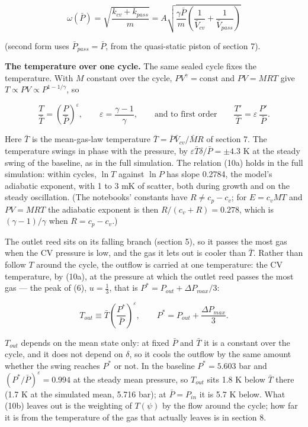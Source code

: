 \documentclass[11pt]{article}
\begin{document}
\begin{equation}
\omega(\bar P) = \sqrt{\frac{k_{cv}+k_{pass}}{m}} = A\sqrt{\frac{\gamma\bar P}{m}\left(\frac{1}{\bar V_{cv}} + \frac{1}{\bar V_{pass}}\right)} \tag{12}
\end{equation}

(second form uses $\bar P_{pass} = \bar P$, from the quasi-static piston of section 7).

\textbf{The temperature over one cycle.} The same sealed cycle fixes the temperature. With $M$ constant over the cycle, $PV^{\gamma} = \mathrm{const}$ and $PV = MRT$ give $T \propto PV \propto P^{1-1/\gamma}$, so

\begin{equation}
\frac{T}{\bar T} = \left(\frac{P}{\bar P}\right)^{\varepsilon}, \qquad \varepsilon = \frac{\gamma-1}{\gamma}, \qquad\text{and to first order}\qquad \frac{T'}{\bar T} = \varepsilon\,\frac{P'}{\bar P} . \tag{10a}
\end{equation}

Here $\bar T$ is the mean-gas-law temperature $\bar T = \bar P\bar V_{cv}/\bar MR$ of section 7. The temperature swings in phase with the pressure, by $\varepsilon\bar T\delta/\bar P = \pm 4.3$ K at the steady swing of the baseline, as in the full simulation. The relation (10a) holds in the full simulation: within cycles, $\ln T$ against $\ln P$ has slope 0.2784, the model's adiabatic exponent, with 1 to 3 mK of scatter, both during growth and on the steady oscillation. (The notebooks' constants have $R \ne c_p - c_v$; for $E = c_vMT$ and $PV = MRT$ the adiabatic exponent is then $R/(c_v + R) = 0.278$, which is $(\gamma - 1)/\gamma$ when $R = c_p - c_v$.)

The outlet reed sits on its falling branch (section 5), so it passes the most gas when the CV pressure is low, and the gas it lets out is cooler than $\bar T$. Rather than follow $T$ around the cycle, the outflow is carried at one temperature: the CV temperature, by (10a), at the pressure at which the outlet reed passes the most gas --- the peak of (6), $u = \tfrac13$, that is $P^* = P_{out} + \Delta P_{max}/3$:

\begin{equation}
T_{out} \equiv \bar T\left(\frac{P^*}{\bar P}\right)^{\varepsilon}, \qquad P^* = P_{out} + \frac{\Delta P_{max}}{3} . \tag{10b}
\end{equation}

$T_{out}$ depends on the mean state only: at fixed $\bar P$ and $\bar T$ it is a constant over the cycle, and it does not depend on $\delta$, so it cools the outflow by the same amount whether the swing reaches $P^*$ or not. In the baseline $P^* = 5.603$ bar and $(P^*/\bar P)^{\varepsilon} = 0.994$ at the steady mean pressure, so $T_{out}$ sits 1.8 K below $\bar T$ there (1.7 K at the simulated mean, 5.716 bar); at $\bar P = P_{in}$ it is 5.7 K below. What (10b) leaves out is the weighting of $T(\psi)$ by the flow around the cycle; how far it is from the temperature of the gas that actually leaves is in section 8.
\end{document}
